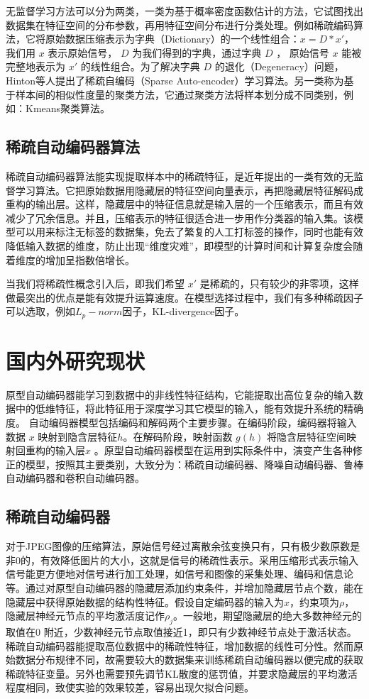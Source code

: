 \documentclass[oneside]{ZJUthesis}
\begin{document}
无监督学习方法可以分为两类，一类为基于概率密度函数估计的方法，它试图找出数据集在特征空间的分布参数，再用特征空间分布进行分类处理。例如稀疏编码算法，它将原始数据压缩表示为字典（Dictionary）的一个线性组合：$x=D*x'$，我们用 $x$ 表示原始信号， $D$ 为我们得到的字典，通过字典 $D$ ， 原始信号 $x$ 能被完整地表示为 $x'$ 的线性组合。为了解决字典 $D$ 的退化（Degeneracy）问题，Hinton等人提出了稀疏自编码（Sparse Auto-encoder）学习算法。另一类称为基于样本间的相似性度量的聚类方法，它通过聚类方法将样本划分成不同类别，例如：Kmeans聚类算法。 

\subsection{稀疏自动编码器算法}
稀疏自动编码器算法能实现提取样本中的稀疏特征，是近年提出的一类有效的无监督学习算法。它把原始数据用隐藏层的特征空间向量表示，再把隐藏层特征解码成重构的输出层。这样，隐藏层中的特征信息就是输入层的一个压缩表示，而且有效减少了冗余信息。并且，压缩表示的特征很适合进一步用作分类器的输入集。该模型可以用来标注无标签的数据集，免去了繁复的人工打标签的操作，同时也能有效降低输入数据的维度，防止出现``维度灾难''，即模型的计算时间和计算复杂度会随着维度的增加呈指数倍增长。

当我们将稀疏性概念引入后，即我们希望 $x'$ 是稀疏的，只有较少的非零项，这样做最突出的优点是能有效提升运算速度。在模型选择过程中，我们有多种稀疏因子可以选取，例如$L_p-norm$因子，KL-divergence因子。


\section{国内外研究现状}
原型自动编码器能学习到数据中的非线性特征结构，它能提取出高位复杂的输入数据中的低维特征，将此特征用于深度学习其它模型的输入，能有效提升系统的精确度\cite{16}。
自动编码器模型包括编码和解码两个主要步骤。在编码阶段，编码器将输入数据 $x$ 映射到隐含层特征$h$。在解码阶段，映射函数 $g(h)$ 将隐含层特征空间映射回重构的输入层$\hat x$ 。原型自动编码器模型在运用到实际条件中，演变产生各种修正的模型，按照其主要类别，大致分为：稀疏自动编码器、降噪自动编码器、鲁棒自动编码器和卷积自动编码器\cite{曲建岭2014深度自动编码器的研究与展}。

\subsection{稀疏自动编码器}
对于JPEG图像的压缩算法，原始信号经过离散余弦变换只有，只有极少数原数是非0的，有效降低图片的大小，这就是信号的稀疏性表示。采用压缩形式表示输入信号能更方便地对信号进行加工处理，如信号和图像的采集处理、编码和信息论等。通过对原型自动编码器的隐藏层添加约束条件，并增加隐藏层节点个数，能在隐藏层中获得原始数据的结构性特征。假设自定编码器的输入为$x$，约束项为$\rho$，隐藏层神经元节点的平均激活度记作$\rho_j$。一般地，期望隐藏层的绝大多数神经元的取值在0 附近，少数神经元节点取值接近1，即只有少数神经节点处于激活状态。稀疏自动编码器能提取高位数据中的稀疏性特征，增加数据的线性可分性。然而原始数据分布规律不同，故需要较大的数据集来训练稀疏自动编码器以便完成的获取稀疏特征变量。另外也需要预先调节KL散度的惩罚值，并要求隐藏层的平均激活程度相同，致使实验的效果较差，容易出现欠拟合问题。
\end{document}
